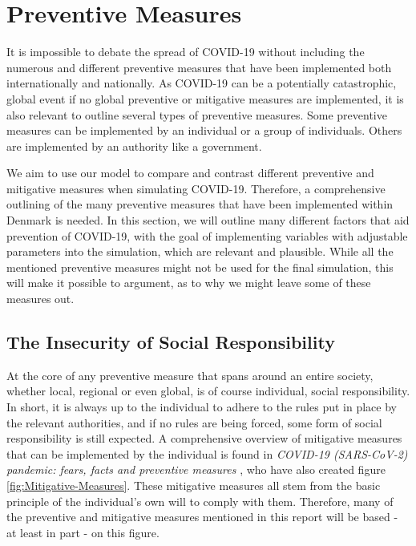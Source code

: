 \section{Preventive Measures} \label{sec: preventive measure}

It is impossible to debate the spread of COVID-19 without including the numerous and different preventive measures that have been implemented both internationally and nationally. As COVID-19 can be a potentially catastrophic, global event if no global preventive or mitigative measures are implemented, it is also relevant to outline several types of preventive measures. Some preventive measures can be implemented by an individual or a group of individuals. Others are implemented by an authority like a government.

We aim to use our model to compare and contrast different preventive and mitigative measures when simulating COVID-19. Therefore, a comprehensive outlining of the many preventive measures that have been implemented within Denmark is needed. In this section, we will outline many different factors that aid prevention of COVID-19, with the goal of implementing variables with adjustable parameters into the simulation, which are relevant and plausible. While all the mentioned preventive measures might not be used for the final simulation, this will make it possible to argument, as to why we might leave some of these measures out.

\subsection{The Insecurity of Social Responsibility}

At the core of any preventive measure that spans around an entire society, whether local, regional or even global, is of course individual, social responsibility. In short, it is always up to the individual to adhere to the rules put in place by the relevant authorities, and if no rules are being forced, some form of social responsibility is still expected. A comprehensive overview of mitigative measures that can be implemented by the individual is found in \textit{COVID-19 (SARS-CoV-2) pandemic: fears, facts and preventive measures} \citep{ayenigbara_covid-19_2020}, who have also created figure \ref{fig:Mitigative-Measures}. These mitigative measures all stem from the basic principle of the individual’s own will to comply with them. Therefore, many of the preventive and mitigative measures mentioned in this report will be based - at least in part - on this figure.

